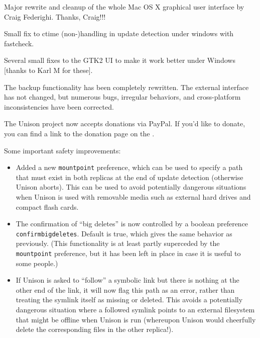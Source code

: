 \begin{changesfromversion}{2.17}
\item Major rewrite and cleanup of the whole Mac OS X graphical user
interface by Craig Federighi.  Thanks, Craig!!!
\item Small fix to ctime (non-)handling in update detection under windows
  with fastcheck.
\item Several small fixes to the GTK2 UI to make it work better under
Windows [thanks to Karl M for these].
\item The backup functionality has been completely rewritten.  The external
interface has not changed, but numerous bugs, irregular behaviors, and
cross-platform inconsistencies have been corrected.
\item The Unison project now accepts donations via PayPal.  If you'd like to
donate, you can find a link to the donation page on the
.
\item Some important safety improvements:
\begin{itemize}
\item Added a new \verb|mountpoint| preference, which can be used to specify
a path that must exist in both replicas at the end of update detection
(otherwise Unison aborts).  This can be used to avoid potentially dangerous
situations when Unison is used with removable media such as external hard
drives and compact flash cards.
\item The confirmation of ``big deletes'' is now controlled by a boolean preference
  \verb|confirmbigdeletes|.  Default is true, which gives the same behavior as
  previously.  (This functionality is at least partly superceded by the
  \verb|mountpoint| preference, but it has been left in place in case it is
  useful to some people.)
  \item If Unison is asked to ``follow'' a symbolic link but there is
  nothing at the other end of the link, it will now flag this path as an
  error, rather than treating the symlink itself as missing or deleted.
  This avoids a potentially dangerous situation where a followed symlink
  points to an external filesystem that might be offline when Unison is run
  (whereupon Unison would cheerfully delete the corresponding files in the
  other replica!).
\end{itemize}


\end{changesfromversion}
